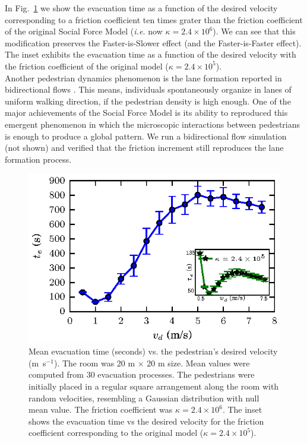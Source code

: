 \documentclass[preprint,12pt]{elsarticle}
\begin{document}
In Fig.~\ref{fis} we show the evacuation time as a function of the desired velocity corresponding to a friction coefficient ten times grater than the friction coefficient of the original Social Force Model (\textit{i.e.} now $\kappa=2.4\times 10^{6}$). We can see that this modification preserves the Faster-is-Slower effect (and the Faster-is-Faster effect). The inset exhibits the evacuation time as a function of the desired velocity with the friction coefficient of the original model ($\kappa=2.4\times 10^{5}$).\\

Another pedestrian dynamics phenomenon is the lane formation reported in 
bidirectional flows \cite{helbing5,feliciani1,guo1,qiao1}. This means, 
individuals spontaneously organize in lanes of uniform walking direction, if the 
pedestrian density is high enough. One of the major achievements of the Social 
Force Model is its ability to reproduced this emergent phenomenon in which the 
microscopic interactions between pedestrians is enough to produce a global 
pattern. We run a bidirectional flow simulation (not shown) and verified that 
the friction increment still reproduces the lane formation process.\\  

\begin{figure}[htbp!]
\centering
\includegraphics[width=0.7\columnwidth]
{./fis_kx10.eps}
\caption{\label{fis} Mean evacuation time (seconds) vs. the pedestrian’s desired velocity (m~s$^{-1}$). The room was 20 m $\times$ 20 m size. Mean values were computed from 30 evacuation processes. The pedestrians were initially placed in a regular square arrangement along the room with random velocities, resembling a Gaussian distribution with null mean value. The friction coefficient was $\kappa=2.4\times10^{6}$. The inset shows the evacuation time vs the desired velocity for the friction coefficient corresponding to the original model ($\kappa=2.4\times10^{5}$).  }
\end{figure}
\end{document}
